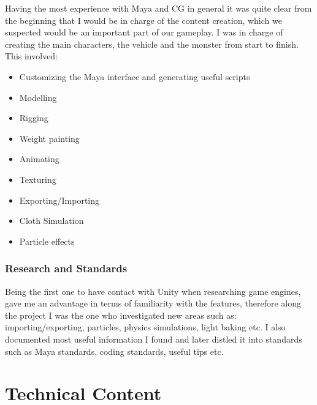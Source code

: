 \documentclass[a4paper,oneside]{memoir}
\begin{document}
                Having the most experience with Maya and CG in general it was quite clear from the beginning that I would be in charge of the content creation, which we suspected would be an important part of our gameplay. I was in charge of creating the main characters, the vehicle and the monster from start to finish. This involved:
                \begin{itemize}
                    \item Customizing the Maya interface and generating useful scripts
                    \item Modelling
                    \item Rigging
                    \item Weight painting
                    \item Animating
                    \item Texturing
                    \item Exporting/Importing
                    \item Cloth Simulation
                    \item Particle effects
                \end{itemize}
                
            \subsection{Research and Standards}
                Being the first one to have contact with Unity when researching game engines, gave me an advantage in terms of familiarity with the features, therefore along the project I was the one who investigated new areas such as: importing/exporting, particles, physics simulations, light baking etc. I also documented most useful information I found and later distled it into standards such as Maya standards, coding standards, useful tips etc.

	\chapter{Technical Content}
\end{document}
